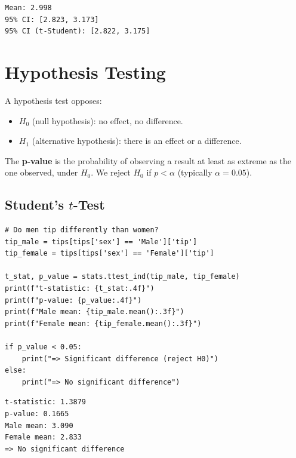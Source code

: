 \begin{codeoutput}
\begin{verbatim}
Mean: 2.998
95% CI: [2.823, 3.173]
95% CI (t-Student): [2.822, 3.175]
\end{verbatim}
\end{codeoutput}

\section{Hypothesis Testing}

\begin{definition}
A hypothesis test opposes:
\begin{itemize}
    \item $H_0$ (null hypothesis): no effect, no difference.
    \item $H_1$ (alternative hypothesis): there is an effect or a difference.
\end{itemize}
The \textbf{p-value} is the probability of observing a result at least as extreme as the one observed, under $H_0$. We reject $H_0$ if $p < \alpha$ (typically $\alpha = 0.05$).
\end{definition}

\subsection{Student's $t$-Test}

\begin{codeblock}[title=\textbf{Python}]
\begin{verbatim}
# Do men tip differently than women?
tip_male = tips[tips['sex'] == 'Male']['tip']
tip_female = tips[tips['sex'] == 'Female']['tip']

t_stat, p_value = stats.ttest_ind(tip_male, tip_female)
print(f"t-statistic: {t_stat:.4f}")
print(f"p-value: {p_value:.4f}")
print(f"Male mean: {tip_male.mean():.3f}")
print(f"Female mean: {tip_female.mean():.3f}")

if p_value < 0.05:
    print("=> Significant difference (reject H0)")
else:
    print("=> No significant difference")
\end{verbatim}
\end{codeblock}

\begin{codeoutput}
\begin{verbatim}
t-statistic: 1.3879
p-value: 0.1665
Male mean: 3.090
Female mean: 2.833
=> No significant difference
\end{verbatim}
\end{codeoutput}

